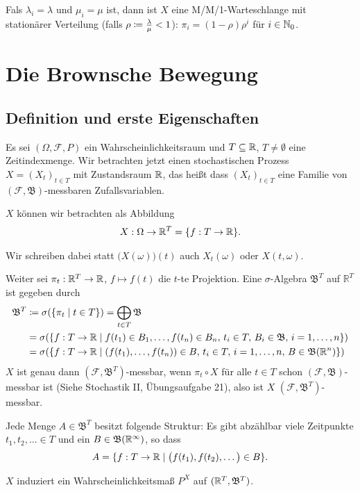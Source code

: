 \documentclass[a4paper,twoside,DIV15,BCOR12mm]{scrbook}
\newcommand{\cF}{\mathcal F}
\newcommand{\borel}{{\mathfrak B}}
\begin{document}
\begin{beispiel}
Fals $\lambda_i=\lambda$ und $\mu_i=\mu$ ist, dann ist $X$ eine M/M/1-Warteschlange mit stationärer Verteilung (falls $\rho\da \frac\lambda\mu < 1$): $\pi_i=(1-\rho)\rho^i$ für $i\in\mathbb{N}_0$.
\end{beispiel}

\chapter{Die Brownsche Bewegung}

\section{Definition und erste Eigenschaften}

Es sei $(\Omega, \cF, P)$ ein Wahrscheinlichkeitsraum und $T\subseteq\mathbb{R}$, $T\ne\emptyset$ eine Zeitindexmenge. Wir betrachten jetzt einen stochastischen Prozess $X=(X_t)_{t\in T}$ mit Zustandsraum $\mathbb{R}$, das heißt dass $(X_t)_{t\in T}$ eine Familie von $(\cF, \borel)$-messbaren Zufallsvariablen.

$X$ können wir betrachten als Abbildung
\begin{align*}
X:\Omega \to \mathbb{R}^T=\{f:T\to \mathbb{R}\}.
\end{align*}

Wir schreiben dabei statt $\big(X(\omega)\big)(t)$ auch $X_t(\omega)$ oder $X(t,\omega)$.

Weiter sei $\pi_t:\mathbb{R}^T \to \mathbb{R}$, $f\mapsto f(t)$ die $t$-te Projektion. Eine $\sigma$-Algebra $\borel^T$ auf $\mathbb R^T$ ist gegeben durch
\begin{align*}
\borel^T &\da \sigma(\{\pi_t\mid t\in T\}) = \bigoplus_{t\in T}\borel \\
&= \sigma(\{f:T\to \MdR \mid f(t_1)\in B_1,\ldots,f(t_n)\in B_n,\, t_i\in T,\, B_i \in \borel,\, i=1,\ldots,n\}) \\
&= \sigma(\{f:T\to \MdR \mid (f(t_1),\ldots,f(t_n))\in B,\, t_i\in T,\, i=1,\ldots,n,\, B\in \borel(\MdR^n)\})
\end{align*}
$X$ ist genau dann $(\cF,\borel^T)$-messbar, wenn $\pi_t\circ X$ für alle $t\in T$ schon $(\cF,\borel)$-messbar ist (Siehe Stochastik II, Übungsaufgabe 21), also ist $X$ $(\cF,\borel^T)$-messbar.

Jede Menge $A\in \borel^T$ besitzt folgende Struktur: Es gibt abzählbar viele Zeitpunkte $t_1,t_2,\ldots\in T$ und ein $B\in\borel(\MdR^\infty)$, so dass 
\[
A= \{f:T\to \mathbb{R} \mid \big(f(t_1),f(t_2),\ldots\big) \in B\}.
\]

$X$ induziert ein Wahrscheinlichkeitsmaß $P^X$ auf $(\MdR^T,\borel^T)$.
\end{document}
